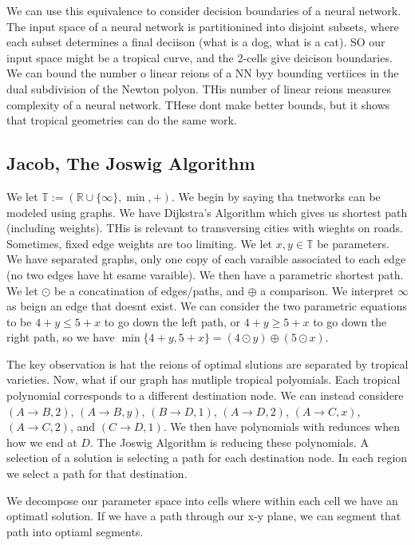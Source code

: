 \documentclass[11pt]{article}
\theoremstyle{definition}
\def\RR{{\mathbb R}}
\def\TT{{\mathbb T}}
\begin{document}
We can use this equivalence to consider decision boundaries of a neural network. The input space of a neural network is partitionined into disjoint subsets, where each subset determines a final deciison (what is a dog, what is a cat). SO our input space might be a tropical curve, and the 2-cells give deicison boundaries. We can bound the number o linear reions of a NN byy bounding vertiices in the dual subdivision of the Newton polyon. THis number of linear reions measures complexity of a neural network. THese dont make better bounds, but it shows that tropical geometries can do the same work.

\subsection{Jacob, The Joswig Algorithm}


We let $\TT:=(\RR\cup\{\infty\}, \min, +)$. We begin by saying tha tnetworks can be modeled using graphs. We have Dijkstra's Algorithm which gives us shortest path (including weights). THis is relevant to transversing cities with wieghts on roads. Sometimes, fixed edge weights are too limiting. We let $x,y \in \TT$ be parameters. We have separated graphs, only one copy of each varaible associated to each edge (no two edges have ht esame varaible). We then have  a parametric shortest path. We let $\odot$ be a concatination of edges/paths, and $\oplus$ a comparison. We interpret $\infty$ as beign an edge that doesnt exist. We can consider the two parametric equations to be $4+y \leq 5+x$ to go down the left path, or $4+y \geq 5+x$ to go down the right path, so we have $\min\{4+y,5+x\} = (4\odot y) \oplus (5\odot x)$.

The key observation is hat the reions of optimal slutions are separated by tropical varieties. Now, what if our graph has mutliple tropical polyomials. Each tropical polynomial corresponds to a different destination node. We can instead considere $(A\rightarrow B,2)$, $(A\rightarrow B,y)$, $(B\rightarrow D,1)$, $(A\rightarrow D,2 )$, $(A \rightarrow C, x)$, $(A \rightarrow C,2)$, and $(C \rightarrow D,1)$. We then have polynomials with redunces when how we end at $D$. The Joswig Algorithm is reducing these polynomials. A selection of a solution is selecting a path for each destination node. In each region we select a path for that destination. 

We decompose our parameter space into cells where within each cell we have an optimatl solution. If we have a path through our x-y plane, we can segment that path into optiaml segments.
\end{document}
